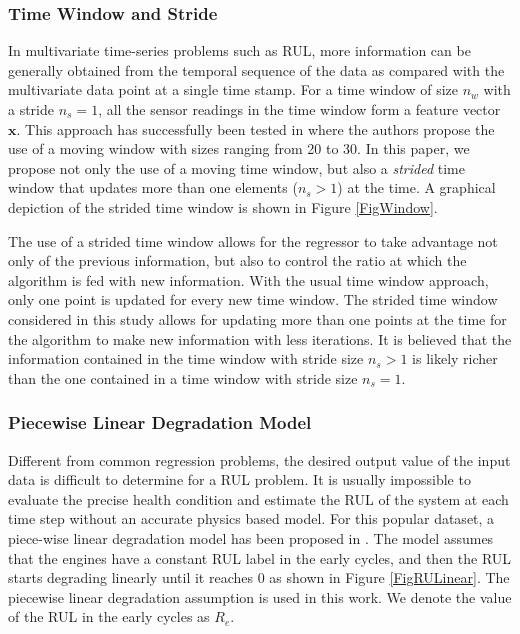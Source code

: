 \documentclass[12pt]{IEEEtran}%
\begin{document}
\subsubsection{Time Window and Stride}

In multivariate time-series problems such as RUL, more information can be
generally obtained from the temporal sequence of the data as compared with the
multivariate data point at a single time stamp. For a time window of size
$n_{w}$ with a stride $n_{s}=1$, all the sensor readings in the time window
form a feature vector $\mathbf{x}$. This approach has successfully been tested
in \cite{Li2018,Lim2016} where the authors propose the use of a moving window
with sizes ranging from 20 to 30. In this paper, we propose not only the use of
a moving time window, but also a \textit{strided} time window that updates
more than one elements ($n_{s}>1$) at the time. A graphical depiction of the
strided time window is shown in Figure \ref{FigWindow}.

The use of a strided time window allows for the regressor to take advantage
not only of the previous information, but also to control the ratio at which
the algorithm is fed with new information. With the usual time window
approach, only one point is updated for every new time window. The strided
time window considered in this study allows for updating more than one points
at the time for the algorithm to make new information with less iterations. It
is believed that the information contained in the time window with stride size
$n_{s}>1$ is likely richer than the one contained in a time window with stride
size $n_{s}=1$.

\subsubsection{Piecewise Linear Degradation Model}

Different from common regression problems, the desired output value of the
input data is difficult to determine for a RUL problem. It is usually
impossible to evaluate the precise health condition and estimate the RUL of
the system at each time step without an accurate physics based model. For this
popular dataset, a piece-wise linear degradation model has been proposed in
\cite{Ramasso2014}. The model assumes that the engines have a constant RUL
label in the early cycles, and then the RUL starts degrading linearly until it
reaches 0 as shown in Figure \ref{FigRULinear}. The piecewise linear
degradation assumption is used in this work. We denote the value of the RUL in
the early cycles as $R_{e}$.
\end{document}
